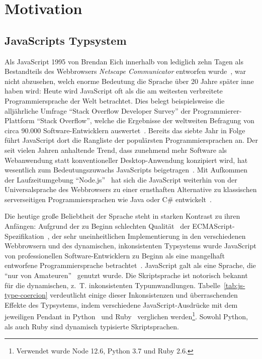 \chapter{Motivation}
\label{chap:motiviation}

\section{JavaScripts Typsystem}

Als JavaScript 1995 von Brendan Eich innerhalb von lediglich zehn Tagen als Bestandteils des Webbrowsers \textit{Netscape Communicator} entworfen wurde~\autocite{severance:2012:js10days}, war nicht abzusehen, welch enorme Bedeutung die Sprache über 20 Jahre später inne haben wird: Heute wird JavaScript oft als die am weitesten verbreitete Programmiersprache der Welt betrachtet. Dies belegt beispielsweise die alljährliche Umfrage \enquote{Stack Overflow Developer Survey} der Programmierer-Plattform \enquote{Stack Overflow}, welche die Ergebnisse der weltweiten Befragung von circa 90.000 Software-Entwicklern auswertet~\autocite{stackoverflow:survey:2019}. Bereits das siebte Jahr in Folge führt JavaScript dort die Rangliste der populärsten Programmiersprachen an.
Der seit vielen Jahren anhaltende Trend, dass zunehmend mehr Software als Webanwendung statt konventioneller Desktop-Anwendung konzipiert wird, hat wesentlich zum Bedeutungszuwachs JavaScripts beigetragen~\autocite{taivalsaari:2017}\autocite{casteleyn:2014:ria}. Mit Aufkommen der Laufzeitumgebung \enquote{Node.js}~\autocite{nodejs} hat sich die JavaScript weiterhin von der Universalsprache des Webbrowsers zu einer ernsthaften Alternative zu klassischen serverseitigen Programmiersprachen wie Java oder C\# entwickelt~\autocite{TILKOV:NODEJS}.

Die heutige große Beliebtheit der Sprache steht in starken Kontrast zu ihren Anfängen: Aufgrund der zu Beginn schlechten Qualität~\autocite{CROCKFORD:JS_MISUNDERSTOOD} der ECMAScript-Spezifikation~\autocite{ECMASCRIPT:1997}, der sehr uneinheitlichen Implementierung in den verschiedenen Webbrowsern und des dynamischen, inkonsistenten Typsystems wurde JavaScript von professionellen Software-Entwicklern zu Beginn als eine mangelhaft entworfene Programmiersprache betrachtet~\autocite{oreilly:2001:js}. JavaScript galt als eine Sprache, die \enquote{nur von Amateuren}~\autocite{CROCKFORD:JS_MISUNDERSTOOD} genutzt wurde. Die Skriptsprache ist notorisch bekannt für die dynamischen, z.~T. inkonsistenten Typumwandlungen. Tabelle~\ref{tab:js-type-coercion} verdeutlicht einige dieser Inkonsistenzen und überraschenden Effekte des Typsystems, indem verschiedene JavaScript-Ausdrücke mit dem jeweiligen Pendant in Python~\autocite{PYTHON3} und Ruby~\autocite{RUBY} verglichen werden\footnote{Verwendet wurde Node 12.6, Python 3.7 und Ruby 2.6.}. Sowohl Python, als auch Ruby sind dynamisch typisierte Skriptsprachen.

